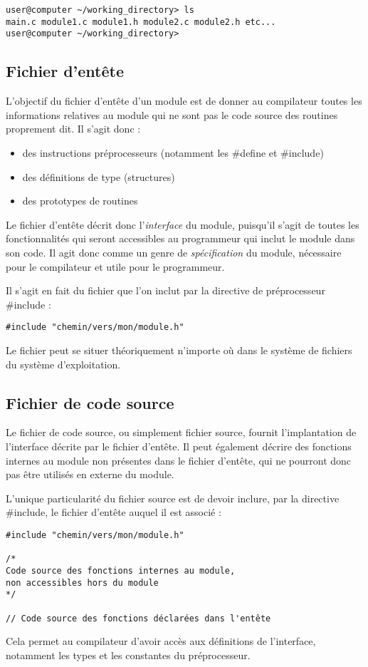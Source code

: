 \documentclass[../../../main.tex]{subfiles}
\begin{document}
\begin{verbatim}
user@computer ~/working_directory> ls
main.c module1.c module1.h module2.c module2.h etc...
user@computer ~/working_directory>
\end{verbatim}
\subsection{Fichier d'entête}
\label{sub:fichier_d_ent_te}
L'objectif du fichier d'entête d'un module est de donner au compilateur toutes les informations relatives au module qui ne sont pas le code source des routines proprement dit. Il s'agit donc :
\begin{itemize}
	\item des instructions préprocesseurs (notamment les \textsf{\#define} et \textsf{\#include})
	\item des définitions de type (structures)
	\item des prototypes de routines
\end{itemize}
Le fichier d'entête décrit donc l'\textit{interface} du module, puisqu'il s'agit de toutes les fonctionnalités qui seront accessibles au programmeur qui inclut le module dans son code. Il agit donc comme un genre de \textit{spécification} du module, nécessaire pour le compilateur et utile pour le programmeur.

Il s'agit en fait du fichier que l'on inclut par la directive de préprocesseur \textsf{\#include} :
\begin{verbatim}
#include "chemin/vers/mon/module.h"
\end{verbatim}
Le fichier peut se situer théoriquement n'importe où dans le système de fichiers du système d'exploitation.
\subsection{Fichier de code source}
\label{sub:fichier_de_code_source}
Le fichier de code source, ou simplement fichier source, fournit l'implantation de l'interface décrite par le fichier d'entête. Il peut également décrire des fonctions internes au module non présentes dans le fichier d'entête, qui ne pourront donc pas être utilisés en externe du module.
 
L'unique particularité du fichier source est de devoir inclure, par la directive \textsf{\#include}, le fichier d'entête auquel il est associé :
\begin{verbatim}
#include "chemin/vers/mon/module.h"

/*
Code source des fonctions internes au module,
non accessibles hors du module
*/

// Code source des fonctions déclarées dans l'entête
\end{verbatim}
Cela permet au compilateur d'avoir accès aux définitions de l'interface, notamment les types et les constantes du préprocesseur.
\end{document}
